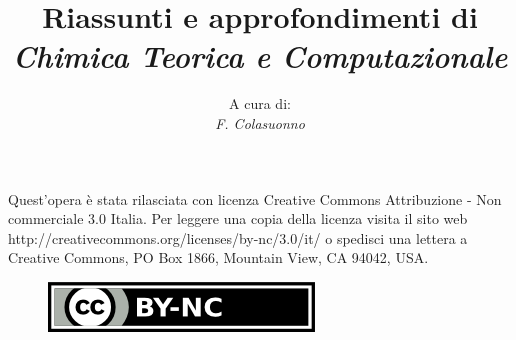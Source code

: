 \documentclass[oneside]{amsbook}
\numberwithin{section}{chapter}
\numberwithin{equation}{section}
\numberwithin{figure}{section}
\begin{document}
\begin{titlepage}
\title{Riassunti e approfondimenti di\\ \emph{Chimica Teorica e Computazionale}}


\author{ A cura di: \\ \textit{F. Colasuonno}}
\end{titlepage}
\maketitle
Quest'opera è stata rilasciata con licenza Creative Commons Attribuzione - Non commerciale 3.0 Italia. Per leggere una copia della licenza visita il sito web http://creativecommons.org/licenses/by-nc/3.0/it/ o spedisci una lettera a Creative Commons, PO Box 1866, Mountain View, CA 94042, USA.
\begin{figure}
\includegraphics[scale=1.0]{licenza}
\end{figure}
\tableofcontents
\end{document}
